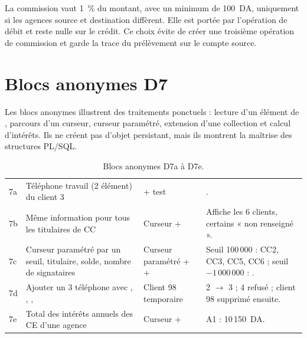 \begin{remarquebox}
La commission vaut 1~\% du montant, avec un minimum de 100~DA, uniquement si
les agences source et destination diffèrent. Elle est portée par l'opération de
débit et reste nulle sur le crédit. Ce choix évite de créer une troisième
opération de commission et garde la trace du prélèvement sur le compte source.
\end{remarquebox}

\section{Blocs anonymes D7}

Les blocs anonymes illustrent des traitements ponctuels : lecture d'un élément
de , parcours d'un curseur, curseur paramétré, extension d'une
collection et calcul d'intérêts. Ils ne créent pas d'objet persistant, mais ils
montrent la maîtrise des structures PL/SQL.

\begin{table}[htbp]
  \centering
  \small
  \caption{Blocs anonymes D7a à D7e.}
  \label{tab:blocs-anonymes}
  \begin{tabularx}{\textwidth}{@{}C{0.9cm}L{4.7cm}L{4.4cm}X@{}}
    \toprule
     &  &  &
     \\
    \midrule
    7a & Téléphone travail (2 élément) du client 3 &
     + test  & . \\
    7b & Même information pour tous les titulaires de CC &
    Curseur +  &
    Affiche les 6 clients, certains « non renseigné ». \\
    7c & Curseur paramétré par un seuil, titulaire, solde, nombre de
    signataires & Curseur paramétré +  +
     &
    Seuil 100\,000 : CC2, CC3, CC5, CC6 ; seuil $-1\,000\,000$ :
    . \\
    7d & Ajouter un 3 téléphone avec , ,
    ,  & Client 98 temporaire &
     2 $\rightarrow$ 3 ; 4 refusé ; client 98 supprimé
    ensuite. \\
    7e & Total des intérêts annuels des CE d'une agence &
    Curseur +  &
    A1 : 10\,150~DA. \\
    \bottomrule
  \end{tabularx}
\end{table}

